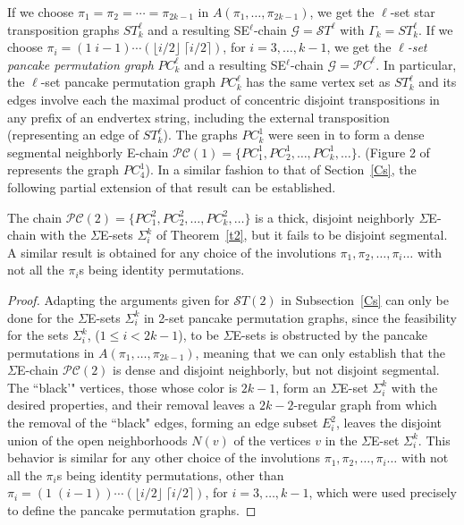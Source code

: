 \documentclass[12pt,reqno]{article}
\begin{document}
If we choose $\pi_1=\pi_2=\cdots=\pi_{2k-1}$ in $A(\pi_1,\ldots,\pi_{2k-1})$, we get the $\ell$-set star transposition graphs $ST^\ell_k$ and a resulting SE$^\ell$-chain ${\mathcal G}={\mathcal ST}^\ell$ with $\Gamma_k=ST^\ell_k$. If we choose
$\pi_i=(1\;i-1)\cdots(\lfloor i/2\rfloor\;\lceil i/2\rceil)$, for $i=3,\ldots,k-1$, we get the {\it $\ell$-set pancake permutation graph} $PC_k^\ell$ and a resulting SE$^\ell$-chain ${\mathcal G}={\mathcal PC}^\ell$. 
In particular, the $\ell$-set pancake permutation graph $PC^\ell_k$ has the same vertex set as $ST^\ell_k$ and its edges involve each the maximal product of concentric disjoint transpositions in any prefix of an endvertex string, including the external transposition (representing an edge of $ST^\ell_k$).
The graphs $PC_k^1$ were seen in \cite{D73} to form a dense segmental neighborly E-chain 
$\mathcal{PC}(1)=\{PC_1^1,PC_2^1,\ldots,PC_k^1,\ldots\}$. (Figure 2 of \cite{D73} represents the graph $PC^1_4$). In a similar fashion to that of Section~\ref{Cs}, the following partial extension of that result can be established.
 
\begin{theorem} 
The chain $\mathcal{PC}(2)=\{PC_1^2,PC_2^2,\ldots,PC_k^2,\ldots\}$ is  a thick, disjoint neighborly $\Sigma$E-chain with the $\Sigma$E-sets $\Sigma_i^k$ of Theorem~\ref{t2}, but it fails to be disjoint segmental. A similar result is obtained for any choice of the involutions $\pi_1,\pi_2,\ldots,\pi_i\ldots$ with not all the $\pi_i$s being identity permutations.
\end{theorem}

\begin{proof} Adapting the arguments given for ${\mathcal ST}(2)$ in Subsection~\ref{Cs} can only be done for the $\Sigma$E-sets $\Sigma_i^k$ in 2-set pancake permutation graphs, since the feasibility for the sets $\Sigma_i^k$, ($1\le i<2k-1$),  to be $\Sigma$E-sets is obstructed by the pancake permutations in $A(\pi_1,\ldots,\pi_{2k-1})$, meaning that we can only establish that the $\Sigma$E-chain $\mathcal{PC}(2)$ is dense and disjoint neighborly, but not disjoint segmental. The ``black'" vertices, those whose color is $2k-1$, form an $\Sigma$E-set $\Sigma^k_i$ with the desired properties, and their removal leaves a $2k-2$-regular graph from which the removal of the ``black" edges, forming an edge subset $E^2_i$, leaves the disjoint union of the open neighborhoods $N(v)$ of the vertices $v$ in the $\Sigma$E-set $\Sigma^k_i$. This behavior is similar for any other choice of the involutions $\pi_1,\pi_2,\ldots,\pi_i\ldots$ with not all the $\pi_i$s being identity permutations, other than $\pi_i=(1\;(i-1))\cdots(\lfloor i/2\rfloor\;\lceil i/2\rceil)$, for $i=3,\ldots,k-1$, which were used precisely to define the pancake permutation graphs.
\end{proof}
\end{document}
